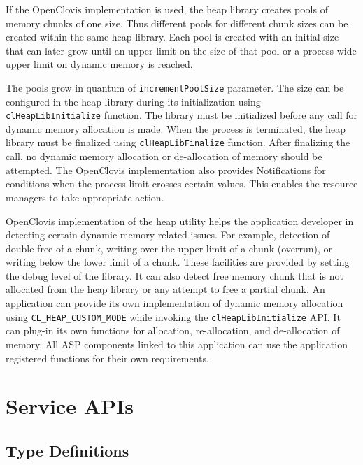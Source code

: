 \begin{flushleft}
If the OpenClovis implementation is used, the heap library creates pools of memory chunks of one size.
Thus different pools for different chunk
sizes can be created within the same heap library. Each pool is created
with an initial size that can later grow until an upper limit on the
size of that pool or a process wide upper limit on dynamic memory is
reached.
\newline
\par
The pools grow in quantum of {\tt{incrementPoolSize}} parameter.
The size can be configured in the heap library during its initialization
using {\tt{clHeapLibInitialize}} function. The library must be
initialized before any call for dynamic memory allocation is made.
When the process is terminated, the heap library must be finalized
using {\tt{clHeapLibFinalize}} function. After finalizing the call, no
dynamic memory allocation or de-allocation of memory should be attempted. The OpenClovis
implementation also provides Notifications for conditions when the process
limit crosses certain values. This enables the resource managers to take
appropriate action.
\newline
\par
OpenClovis implementation of the heap utility helps the application developer
in detecting certain dynamic memory related issues. For example,
detection of double free of a chunk,  
writing over the upper limit of a chunk (overrun),  or 
writing below the lower limit of a chunk.
These facilities are provided by setting the debug level of the
library. It can also detect free memory chunk that is not
allocated from the heap library or any attempt to free a partial
chunk. An application can provide its own implementation of
dynamic memory allocation using
{\tt{CL\_\-HEAP\_\-CUSTOM\_\-MODE}} while invoking the
{\tt{clHeapLibInitialize}} API. It can plug-in its own functions
for allocation, re-allocation, and de-allocation of memory. All ASP components linked to this application can use the
application registered functions for their own requirements.



\chapter{Service APIs}


\section{Type Definitions}


\end{flushleft}
